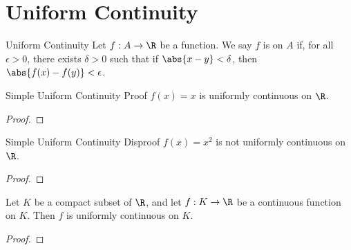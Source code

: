 \section{Uniform Continuity}

\begin{dfnbox}{Uniform Continuity}{}
    Let $f : A \to \R$ be a function. We say $f$ is  on $A$ if, for all $\epsilon > 0$, there exists $\delta > 0$ such that if $\abs{x-y} < \delta$, then $\abs{f(x) - f(y)} < \epsilon$.
\end{dfnbox}

\begin{exbox}{Simple Uniform Continuity Proof}{}
    $f(x) = x$ is uniformly continuous on $\R$.
    \tcblower
    \begin{proof}

    \end{proof}
\end{exbox}

\begin{exbox}{Simple Uniform Continuity Disproof}{}
    $f(x) = x^2$ is not uniformly continuous on $\R$.
    \tcblower
    \begin{proof}

    \end{proof}
\end{exbox}

\begin{thmbox}{}{}
    Let $K$ be a compact subset of $\R$, and let $f : K \to \R$ be a continuous function on $K$. Then $f$ is uniformly continuous on $K$.
    \tcblower
    \begin{proof}

    \end{proof}
\end{thmbox}
